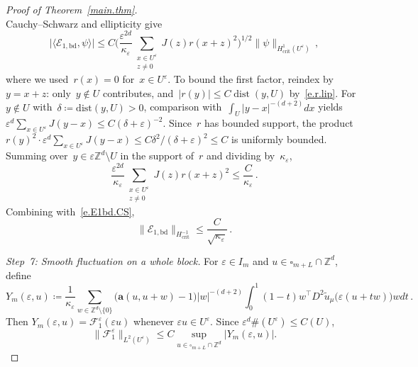 \documentclass[11pt]{amsart}
\theoremstyle{plain}
\theoremstyle{definition}
\theoremstyle{remark}
\newcommand{\Zd}{\mathbb{Z}^d}
\renewcommand{\a}{\mathbf{a}}
\newcommand{\cu}{\square}
\newcommand{\eps}{\varepsilon}
\begin{document}
\begin{proof}[Proof of Theorem~\ref{main.thm}]
\[		\]
		Cauchy--Schwarz and ellipticity give
		\begin{equation}
			\label{e.E1bd.CS}
			\bigl|\langle \mathcal{E}_{1,\mathrm{bd}}, \psi\rangle\bigr|
			\le C\biggl(\frac{\eps^{2d}}{\kappa_\eps}\sum_{\substack{x \in U^\eps \\ z \ne 0}} J(z) r(x{+}z)^2\biggr)^{1/2} \|\psi\|_{H^1_{\mathrm{crit}}(U^\eps)}\,,
		\end{equation}
		where we used~$r(x) = 0$ for~$x \in U^\eps$.
		To bound the first factor, reindex by~$y = x{+}z$: only~$y \notin U$ contributes, and~$|r(y)| \le C\operatorname{dist}(y,U)$ by~\eqref{e.r.lip}.
		For~$y \notin U$ with~$\delta \coloneqq \mathrm{dist}(y,U) > 0$, comparison with~$\int_U |y{-}x|^{-(d+2)} dx$ yields~$\eps^d\sum_{x \in U^\eps} J(y{-}x) \le C(\delta + \eps)^{-2}$.
		Since~$r$ has bounded support, the product~$r(y)^2 \cdot \eps^d\sum_{x \in U^\eps} J(y{-}x) \le C\delta^2 / (\delta + \eps)^{2} \le C$ is uniformly bounded.
		Summing over~$y \in \eps\Zd \setminus U$ in the support of~$r$ and dividing by~$\kappa_\eps$,
		\[
		\frac{\eps^{2d}}{\kappa_\eps}\sum_{\substack{x \in U^\eps \\ z \ne 0}} J(z) r(x{+}z)^2 \le \frac{C}{\kappa_\eps}\,.
		\]
		Combining with~\eqref{e.E1bd.CS},
		\begin{equation}
			\label{e.E1bd.bound}
			\|\mathcal{E}_{1,\mathrm{bd}}\|_{H^{-1}_{\mathrm{crit}}} \le \frac{C}{\sqrt{\kappa_\eps}}\,.
		\end{equation}
		
		\smallskip
		
		\emph{Step~7: Smooth fluctuation on a whole block.}
		For $\eps \in I_m$ and $u \in \cu_{m+L} \cap \Zd$, define
		\[
		Y_m(\eps, u) \coloneqq \frac{1}{\kappa_\eps} \sum_{w \in \Zd \setminus \{0\}} \bigl(\a(u, u{+}w) - 1\bigr) |w|^{-(d+2)} \int_0^1 (1{-}t) w^\top D^2\widetilde u_\mu\bigl(\eps(u{+}tw)\bigr) w dt\,.
		\]
		Then $Y_m(\eps, u) = \mathcal{F}_1^\eps(\eps u)$ whenever $\eps u \in U^\eps$.
		Since $\eps^d \#(U^\eps) \le C(U)$,
		\begin{equation}
			\label{e.F1.micro}
			\|\mathcal{F}_1^\eps\|_{L^2(U^\eps)} \le C \sup_{u \in \cu_{m+L} \cap \Zd} |Y_m(\eps, u)|.
		\end{equation}
		

\end{proof}
\end{document}
